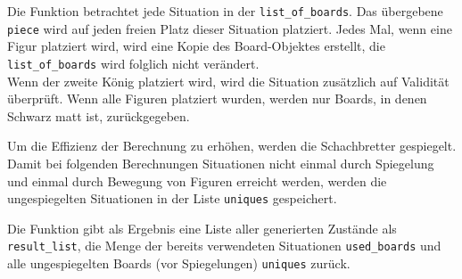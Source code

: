 \documentclass[a4paper,12pt]{article}
\begin{document}
Die Funktion betrachtet jede Situation in der \texttt{list\_of\_boards}.
Das übergebene \texttt{piece} wird auf jeden freien Platz dieser
Situation platziert. Jedes Mal, wenn eine Figur platziert wird, wird
eine Kopie des Board-Objektes erstellt, die \texttt{list\_of\_boards}
wird folglich nicht verändert.\\
Wenn der zweite König platziert wird, wird die Situation zusätzlich auf
Validität überprüft. Wenn alle Figuren platziert wurden, werden nur
Boards, in denen Schwarz matt ist, zurückgegeben.

Um die Effizienz der Berechnung zu erhöhen, werden die Schachbretter
gespiegelt. Damit bei folgenden Berechnungen Situationen nicht einmal
durch Spiegelung und einmal durch Bewegung von Figuren erreicht werden,
werden die ungespiegelten Situationen in der Liste \texttt{uniques}
gespeichert.

Die Funktion gibt als Ergebnis eine Liste aller generierten Zustände als
\texttt{result\_list}, die Menge der bereits verwendeten Situationen
\texttt{used\_boards} und alle ungespiegelten Boards (vor Spiegelungen)
\texttt{uniques} zurück.
\end{document}
